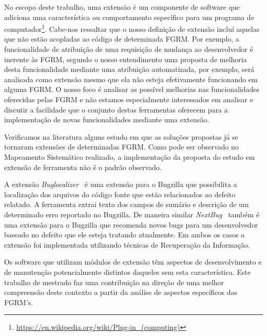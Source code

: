 No escopo deste trabalho, uma extensão é um componente de software que adiciona
uma característica ou comportamento específico para um programa de
computador\footnote{\url{https://en.wikipedia.org/wiki/Plug-in_(computing)}}.
Cabe-nos ressaltar que o nosso definição de extensão incluí aquelas que não estão
acopladas ao código de determinada FGRM\@. Por exemplo, a funcionalidade de
atribuição de uma requisição de mudança ao desenvolvedor é inerente às FGRM,
segundo o nosso entendimento uma proposta de melhoria desta funcionalidade
mediante uma atribuição automatizada, por exemplo, será analisada como extensão
mesmo que ela não esteja efetivamente funcionando em alguma FGRM\@. O nosso foco é
analisar as possível melhorias nas funcionalidades oferecidas pelas FGRM e não
estamos especialmente interessados em analisar e discutir a facilidade que o
conjunto destas ferramentas oferecem para a implementação de novas
funcionalidades mediante uma extensão.  

Verificamos na literatura alguns estudo em que as soluções propostas já se
tornaram extensões de determinadas FGRM. Como pode ser observado no Mapeamento
Sistemático realizado, a implementação da proposta do estudo em extensão de ferramenta
não é o padrão observado.

A extensão \textit{Buglocalizer}~\cite{Thung:2014:BIT:2635868.2661678} é uma
extensão para o Bugzilla que possibilita a localização dos arquivos do código
fonte que estão relacionados ao defeito relatado. A ferramenta extrai texto dos
campos de sumário e descrição de um determinado erro reportado no Bugzilla. De
maneira similar \textit{NextBug}~\cite{101186} também é uma extensão para o
Bugzilla que recomenda novos bugs para um desenvolvedor baseado no defeito que
ele esteja tratando atualmente. Em ambos os casos a extensão foi implementada
utilizando técnicas de Recuperação da Informação.

Os software que utilizam módulos de extensão têm aspectos de desenvolvimento e
de manutenção potencialmente distintos daqueles sem esta característica. Este
trabalho de mestrado faz uma contribuição na direção de uma melhor compreensão
deste contexto a partir da análise de aspectos específicos das FGRM's.
